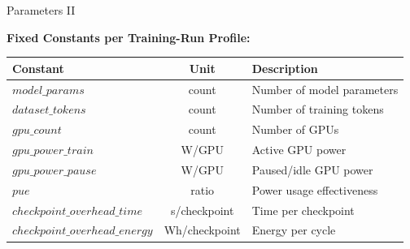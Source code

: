 \begin{frame}[t]{Parameters II}{}

  \small

  \textbf{Fixed Constants per Training-Run Profile:}
  \newline
  \begin{tabular}{l|c|l}
    \toprule
    Constant & Unit & Description \\
    \midrule
    $\mathit{model\_params}$ & count & Number of model parameters \\
    $\mathit{dataset\_tokens}$ & count & Number of training tokens \\
    $\mathit{gpu\_count}$ & count & Number of GPUs \\
    $\mathit{gpu\_power\_train}$ & W/GPU & Active GPU power \\
    $\mathit{gpu\_power\_pause}$ & W/GPU & Paused/idle GPU power \\
    $\mathit{pue}$ & ratio & Power usage effectiveness \\
    $\mathit{checkpoint\_overhead\_time}$ & s/checkpoint & Time per
    checkpoint \\
    $\mathit{checkpoint\_overhead\_energy}$ & Wh/checkpoint & Energy
    per cycle \\
    \bottomrule
  \end{tabular}%

\end{frame}
